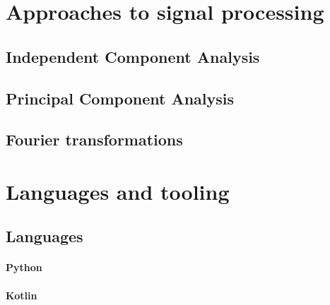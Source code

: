 \section{Approaches to signal processing}

\subsection{Independent Component Analysis}
\subsection{Principal Component Analysis}
\subsection{Fourier transformations}



\section{Languages and tooling}
\subsection{Languages}
\paragraph{Python}
\paragraph{Kotlin}

